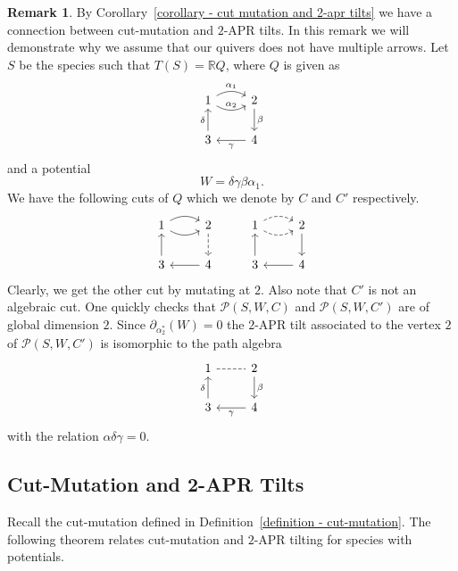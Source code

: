 \documentclass[a4paper, reqno]{amsart}
\theoremstyle{definition}
\newtheorem{myrem}[mythm]{Remark}
\newcommand{\R}{\mathbb{R}}
\begin{document}
\begin{myrem}
	By Corollary~\ref{corollary - cut mutation and 2-apr tilts} we have a connection between cut-mutation and $2$-APR tilts. In this remark we will demonstrate why we assume that our quivers does not have multiple arrows. Let $S$ be the species such that $T(S) = \R Q$, where $Q$ is given as
	\begin{equation*}
		\begin{tikzcd}
			1 \arrow[bend left, r, "\alpha_1"] \arrow[bend right, r, "\alpha_2"] & 2 \arrow[d, "\beta"]\\
			3 \arrow[u, "\delta"] & 4 \arrow[l, "\gamma"]
		\end{tikzcd}
	\end{equation*}
	and a potential
	\begin{equation*}
		W = \delta \gamma \beta \alpha_1.
	\end{equation*}
	We have the following cuts of $Q$ which we denote by $C$ and $C'$ respectively.
	\begin{equation*}
		\begin{tikzcd}
			1 \arrow[bend left, r] \arrow[bend right, r] & 2 \arrow[d, dashed] & 1 \arrow[bend left, r, dashed] \arrow[bend right, r, dashed] & 2 \arrow[d] \\
			3 \arrow[u] & 4 \arrow[l] & 3 \arrow[u] & 4 \arrow[l]
		\end{tikzcd}
	\end{equation*}
	Clearly, we get the other cut by mutating at $2$. Also note that $C'$ is not an algebraic cut. One quickly checks that $\mathcal{P}(S, W, C)$ and $\mathcal{P}(S, W, C')$ are of global dimension $2$. Since $\partial_{\alpha_2^*}(W) = 0$ the $2$-APR tilt associated to the vertex $2$ of $\mathcal{P}(S, W, C')$ is isomorphic to the path algebra
	\begin{equation*}
		\begin{tikzcd}
			1 \arrow[r, dashed, -] & 2 \arrow[d, "\beta"] \\
			3 \arrow[u, "\delta"] & 4 \arrow[l, "\gamma"]
		\end{tikzcd}
	\end{equation*}
	with the relation $\alpha\delta\gamma = 0$.
\end{myrem}

\fi

\subsection{Cut-Mutation and 2-APR Tilts}
Recall the cut-mutation defined in Definition~\ref{definition - cut-mutation}. The following theorem relates cut-mutation and $2$-APR tilting for species with potentials.
\end{document}
